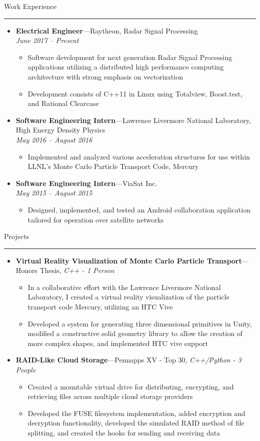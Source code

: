 \documentclass[10pt,oneside]{article}
\newcommand{\sectitle}[1]{
  \begin{flushleft}{\selectfont\Large#1}\end{flushleft}
}
\newenvironment{ressection}[1]{
  \vspace{2pt}
  \sectitle{#1}
  \vspace{-10pt}\rule{\textwidth}{0.5pt}
  \vspace{-10pt}
  \begin{itemize}[leftmargin=13pt]
  \vspace{3pt}
}{
  \end{itemize}
}
\newcommand{\ressubitem}[1]{
  \vspace{-1pt}
  \item \begin{flushleft} #1 \end{flushleft}
}
\newcommand{\resbigitemline}[3]{
  \vspace{-5pt}
  \item
  \textbf{#1}---#2, 
  \textit{#3}
}
\newcommand{\resbigitem}[3]{
  \vspace{-5pt}
  \item
  \textbf{#1}---#2 \\
  \textit{#3}
}
\newenvironment{ressubsec}[3]{
  \resbigitem{#1}{#2}{#3}
  \vspace{-4pt}
  \begin{itemize}[leftmargin=*]

}{
  \end{itemize}
}
\newenvironment{ressubsecline}[3]{
  \resbigitemline{#1}{#2}{#3}
  \vspace{-2pt}
  \begin{itemize}
}{
  \end{itemize}
}
\begin{document}
\begin{ressection}{Work Experience}
  \begin{ressubsec}{Electrical Engineer}{Raytheon, Radar Signal Processing}{June 2017 -- Present}
    \ressubitem{Software development for next generation Radar Signal Processing applications utilizing a distributed high performance computing architecture with strong emphasis on vectorization}
    \ressubitem{Development consists of C++11 in Linux using Totalview, Boost.test, and Rational Clearcase}
  \end{ressubsec}
  
  \begin{ressubsec}{Software Engineering Intern}{Lawrence Livermore National Laboratory, High Energy Density Physics}{May 2016 -- August 2016}
    \ressubitem{Implemented and analyzed various acceleration structures for use within LLNL's Monte Carlo Particle Transport Code, Mercury}
  \end{ressubsec}
  
  \begin{ressubsec}{Software Engineering Intern}{ViaSat Inc.}{May 2015 -- August 2015}
    \ressubitem{Designed, implemented, and tested an Android collaboration application tailored for operation over satellite networks}
  \end{ressubsec}

\end{ressection}



\begin{ressection}{Projects}
  \begin{ressubsecline}{Virtual Reality Visualization of Monte Carlo Particle Transport}{Honors Thesis}{C++ - 1 Person}
    \ressubitem{In a collaborative effort with the Lawrence Livermore National Laboratory, I created a virtual reality visualization of the particle transport code Mercury, utilizing an HTC Vive}
    \ressubitem{Developed a system for generating three dimensional primitives in Unity, modified a constructive solid geometry library to allow the creation of more complex shapes, and implemented HTC vive support}
  \end{ressubsecline}
  \begin{ressubsecline}{RAID-Like Cloud Storage}{Pennapps XV - Top 30}{C++/Python - 3 People}
    \ressubitem{Created a mountable virtual drive for distributing, encrypting, and retrieving files across multiple cloud storage providers}
    \ressubitem{Developed the FUSE filesystem implementation, added encryption and decryption functionality, developed the simulated RAID method of file splitting, and created the hooks for sending and receiving data}
  \end{ressubsecline}

\end{ressection}
\end{document}
